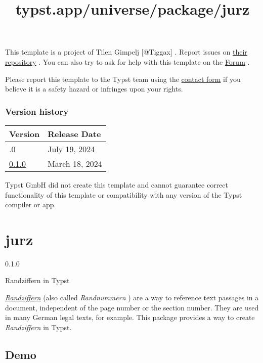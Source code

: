This template is a project of Tilen Gimpelj {[}@Tiggax{]} . Report
issues on \href{https://github.com/Tiggax/famnit_typst_template}{their
repository} . You can also try to ask for help with this template on the
\href{https://forum.typst.app}{Forum} .

Please report this template to the Typst team using the
\href{https://typst.app/contact}{contact form} if you believe it is a
safety hazard or infringes upon your rights.

\label{versions}
\subsubsection{Version history}\label{version-history}

\begin{longtable}[]{@{}ll@{}}
\toprule\noalign{}
Version & Release Date \\
\midrule\noalign{}
\endhead
\bottomrule\noalign{}
\endlastfoot
0.2.0 & July 19, 2024 \\
\href{https://typst.app/universe/package/sunny-famnit/0.1.0/}{0.1.0} &
March 18, 2024 \\
\end{longtable}

Typst GmbH did not create this template and cannot guarantee correct
functionality of this template or compatibility with any version of the
Typst compiler or app.


\title{typst.app/universe/package/jurz}

\label{banner}
\section{jurz}\label{jurz}

{ 0.1.0 }

Randziffern in Typst

\label{readme}
\href{https://de.wikipedia.org/w/index.php?title=Randnummer&oldid=231943223}{\emph{Randziffern}}
(also called \emph{Randnummern} ) are a way to reference text passages
in a document, independent of the page number or the section number.
They are used in many German legal texts, for example. This package
provides a way to create \emph{Randziffern} in Typst.

\subsection{Demo}\label{demo}


